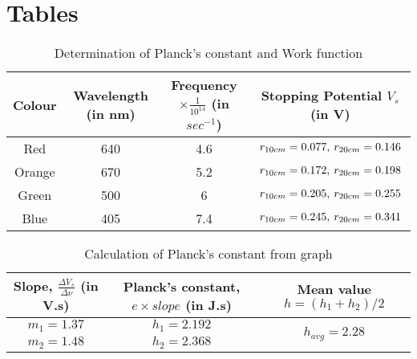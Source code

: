 \documentclass[a4paper,12pt]{article}
\begin{document}
\section{Tables}
\begin{table}[H]
    \def\arraystretch{2}
    \begin{center}
        \caption{Determination of Planck's constant and Work function}
        \begin{tabular}{|c|c|c|c|}
            \hline
            Colour & Wavelength (in nm) & Frequency\(\times \frac{1}{10^{14}}\) (in \(sec^{-1}\))& Stopping Potential \(V_s\) (in V)\\
            \hline
            Red & 640 & 4.6 & \(r_{10cm} = 0.077 ,\hspace{2px} r_{20cm} = 0.146\)\\
            \hline
            Orange & 670 & 5.2 & \(r_{10cm} = 0.172 ,\hspace{2px} r_{20cm} = 0.198\)\\
            \hline
            Green & 500 & 6 & \(r_{10cm} = 0.205 ,\hspace{2px} r_{20cm} = 0.255\)\\
            \hline
            Blue & 405 & 7.4 & \(r_{10cm} = 0.245 ,\hspace{2px} r_{20cm} = 0.341\)\\
            \hline
        \end{tabular}
    \end{center}
\end{table}

\begin{table}[H]
    \def\arraystretch{2}
    \begin{center}
        \caption{Calculation of Planck's constant from graph}
        \begin{tabular}{|c|c|c|}
            \hline
            Slope, \(\frac{\Delta V_s}{\Delta \nu}\) (in V.s) & Planck's constant, \(e \times slope\) (in J.s) & Mean value \(h = (h_1 + h_2)/2\) \\
            \hline
            \(m_1 = 1.37\) & \(h_1 = 2.192\) & \multirow{2}{*}{\(h_{avg} = 2.28\)} \\
            \cline{1-2}
            \(m_2 = 1.48\) & \(h_2 = 2.368\) & \\
            \hline
        \end{tabular}
    \end{center}
\end{table}
\end{document}
